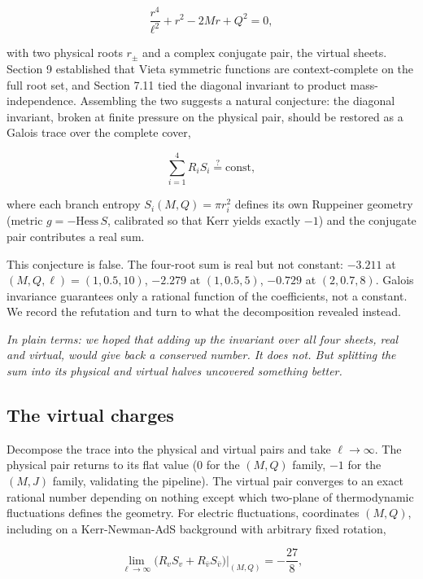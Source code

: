 \documentclass[11pt]{article}
\begin{document}
\begin{equation*}
\frac{r^4}{\ell^2} + r^2 - 2Mr + Q^2 = 0, \tag{10.1}
\end{equation*}

with two physical roots $r_\pm$ and a complex conjugate pair, the virtual sheets. Section 9 established that Vieta symmetric functions are context-complete on the full root set, and Section 7.11 tied the diagonal invariant to product mass-independence. Assembling the two suggests a natural conjecture: the diagonal invariant, broken at finite pressure on the physical pair, should be restored as a Galois trace over the complete cover,

\begin{equation*}
\sum_{i=1}^{4} R_i S_i \stackrel{?}{=} \text{const}, \tag{10.2}
\end{equation*}

where each branch entropy $S_i(M,Q) = \pi r_i^2$ defines its own Ruppeiner geometry (metric $g = -\mathrm{Hess}\,S$, calibrated so that Kerr yields exactly $-1$) and the conjugate pair contributes a real sum.

This conjecture is false. The four-root sum is real but not constant: $-3.211$ at $(M,Q,\ell) = (1, 0.5, 10)$, $-2.279$ at $(1, 0.5, 5)$, $-0.729$ at $(2, 0.7, 8)$. Galois invariance guarantees only a rational function of the coefficients, not a constant. We record the refutation and turn to what the decomposition revealed instead.

\emph{In plain terms: we hoped that adding up the invariant over all four sheets, real and virtual, would give back a conserved number. It does not. But splitting the sum into its physical and virtual halves uncovered something better.}

\subsection{The virtual charges}

Decompose the trace into the physical and virtual pairs and take $\ell \to \infty$. The physical pair returns to its flat value ($0$ for the $(M,Q)$ family, $-1$ for the $(M,J)$ family, validating the pipeline). The virtual pair converges to an exact rational number depending on nothing except which two-plane of thermodynamic fluctuations defines the geometry. For electric fluctuations, coordinates $(M,Q)$, including on a Kerr-Newman-AdS background with arbitrary fixed rotation,

\begin{equation*}
\lim_{\ell\to\infty}\bigl(R_v S_v + R_{\bar v} S_{\bar v}\bigr)\Big|_{(M,Q)} = -\frac{27}{8}, \tag{10.3}
\end{equation*}
\end{document}
